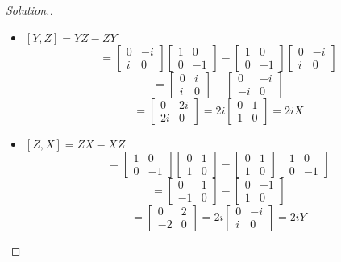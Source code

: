 \documentclass[12pt]{article}
\begin{document}
\begin{proof}[Solution.]~\\
\begin{itemize}
\item $[Y,Z]=YZ-ZY$
$$=\begin{bmatrix}
0 & -i\\
i & 0
\end{bmatrix}
\begin{bmatrix}
1 & 0\\
0 & -1
\end{bmatrix}-
\begin{bmatrix}
1 & 0\\
0 & -1
\end{bmatrix}
\begin{bmatrix}
0 & -i\\
i & 0
\end{bmatrix}$$
$$=\begin{bmatrix}
0 & i\\
i & 0
\end{bmatrix}-
\begin{bmatrix}
0 & -i\\
-i & 0
\end{bmatrix}$$
$$=\begin{bmatrix}
0 & 2i\\
2i & 0
\end{bmatrix}=2i
\begin{bmatrix}
0 & 1\\
1 & 0
\end{bmatrix}=2iX$$

\item $[Z,X]=ZX-XZ$
$$=\begin{bmatrix}
1 & 0\\
0 & -1
\end{bmatrix}
\begin{bmatrix}
0 & 1\\
1 & 0
\end{bmatrix}-
\begin{bmatrix}
0 & 1\\
1 & 0
\end{bmatrix}
\begin{bmatrix}
1 & 0\\
0 & -1
\end{bmatrix}$$
$$=\begin{bmatrix}
0 & 1\\
-1 & 0
\end{bmatrix}-
\begin{bmatrix}
0 & -1\\
1 & 0
\end{bmatrix}$$
$$=\begin{bmatrix}
0 & 2\\
-2 & 0
\end{bmatrix}=2i
\begin{bmatrix}
0 & -i\\
i & 0
\end{bmatrix}=2iY$$
\end{itemize}
\end{proof}
\end{document}
